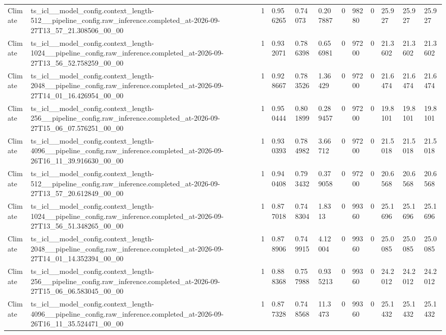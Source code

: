 \begin{tabular}{llllllllllll}
Climate & ts\_icl\_\_model\_config.context\_length-512\_\_pipeline\_config.raw\_inference.completed\_at-2026-09-27T13\_57\_21.308506\_00\_00 & 1 & 0.956265 & 0.74073 & 0.207887 & 0 & 98280 & 0 & 25.927 & 25.927 & 25.927 \\
Climate & ts\_icl\_\_model\_config.context\_length-1024\_\_pipeline\_config.raw\_inference.completed\_at-2026-09-27T13\_56\_52.758259\_00\_00 & 1 & 0.932071 & 0.786398 & 0.656981 & 0 & 97200 & 0 & 21.3602 & 21.3602 & 21.3602 \\
Climate & ts\_icl\_\_model\_config.context\_length-2048\_\_pipeline\_config.raw\_inference.completed\_at-2026-09-27T14\_01\_16.426954\_00\_00 & 1 & 0.928667 & 0.783526 & 1.36429 & 0 & 97200 & 0 & 21.6474 & 21.6474 & 21.6474 \\
Climate & ts\_icl\_\_model\_config.context\_length-256\_\_pipeline\_config.raw\_inference.completed\_at-2026-09-27T15\_06\_07.576251\_00\_00 & 1 & 0.950444 & 0.801899 & 0.289457 & 0 & 97200 & 0 & 19.8101 & 19.8101 & 19.8101 \\
Climate & ts\_icl\_\_model\_config.context\_length-4096\_\_pipeline\_config.raw\_inference.completed\_at-2026-09-26T16\_11\_39.916630\_00\_00 & 1 & 0.930393 & 0.784982 & 3.66712 & 0 & 97200 & 0 & 21.5018 & 21.5018 & 21.5018 \\
Climate & ts\_icl\_\_model\_config.context\_length-512\_\_pipeline\_config.raw\_inference.completed\_at-2026-09-27T13\_57\_20.612849\_00\_00 & 1 & 0.940408 & 0.793432 & 0.379058 & 0 & 97200 & 0 & 20.6568 & 20.6568 & 20.6568 \\
Climate & ts\_icl\_\_model\_config.context\_length-1024\_\_pipeline\_config.raw\_inference.completed\_at-2026-09-27T13\_56\_51.348265\_00\_00 & 1 & 0.877018 & 0.748304 & 1.8313 & 0 & 99360 & 0 & 25.1696 & 25.1696 & 25.1696 \\
Climate & ts\_icl\_\_model\_config.context\_length-2048\_\_pipeline\_config.raw\_inference.completed\_at-2026-09-27T14\_01\_14.352394\_00\_00 & 1 & 0.878906 & 0.749915 & 4.12004 & 0 & 99360 & 0 & 25.0085 & 25.0085 & 25.0085 \\
Climate & ts\_icl\_\_model\_config.context\_length-256\_\_pipeline\_config.raw\_inference.completed\_at-2026-09-27T15\_06\_06.583045\_00\_00 & 1 & 0.888368 & 0.757988 & 0.935213 & 0 & 99360 & 0 & 24.2012 & 24.2012 & 24.2012 \\
Climate & ts\_icl\_\_model\_config.context\_length-4096\_\_pipeline\_config.raw\_inference.completed\_at-2026-09-26T16\_11\_35.524471\_00\_00 & 1 & 0.877328 & 0.748568 & 11.3473 & 0 & 99360 & 0 & 25.1432 & 25.1432 & 25.1432 \\

\end{tabular}
